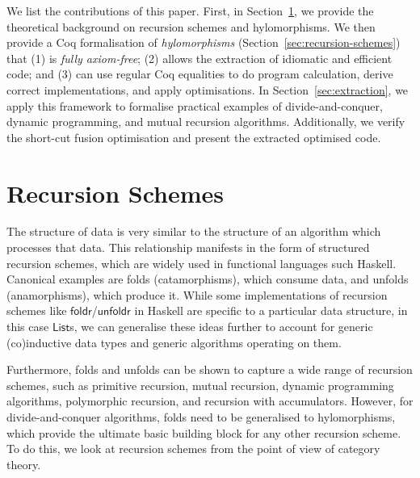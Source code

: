 \documentclass[a4paper,UKenglish,cleveref, autoref, thm-restate]{lipics-v2021}
\newcommand{\operator}[1]{\textsf{#1}}
\begin{document}
We list the contributions of this paper. First, in
Section~\ref{sec:category-theory}, we provide the theoretical background on
recursion schemes and hylomorphisms. We then provide a Coq formalisation of
\emph{hylomorphisms} (Section~\ref{sec:recursion-schemes}) that (1) is
\emph{fully axiom-free}; (2) allows the extraction of idiomatic and efficient
code; and (3) can use regular Coq equalities to do program calculation, derive
correct implementations, and apply optimisations. In
Section~\ref{sec:extraction}, we apply this framework to formalise practical
examples of divide-and-conquer, dynamic programming, and mutual recursion
algorithms. Additionally, we verify the short-cut fusion optimisation and
present the extracted optimised code.

\section{Recursion Schemes}\label{sec:category-theory}
The structure of data is very similar to the structure of an algorithm which
processes that data. This relationship manifests in the form of structured
recursion schemes, which are widely used in functional languages such Haskell.
Canonical examples are folds (catamorphisms), which consume data, and unfolds
(anamorphisms), which produce it. While some implementations of recursion
schemes like $\operator{foldr}$/$\operator{unfoldr}$ in Haskell are specific to
a particular data structure, in this case $\operator{List}$s, we can generalise
these ideas further to account for generic (co)inductive data types and generic
algorithms operating on them.

Furthermore, folds and unfolds can be shown to capture a wide range of recursion
schemes, such as primitive recursion, mutual recursion, dynamic programming
algorithms, polymorphic recursion, and recursion with accumulators. However, for
divide-and-conquer algorithms, folds need to be generalised to hylomorphisms,
which provide the ultimate basic building block for any other recursion scheme.
To do this, we look at recursion schemes from the point of view of category
theory.
\end{document}
